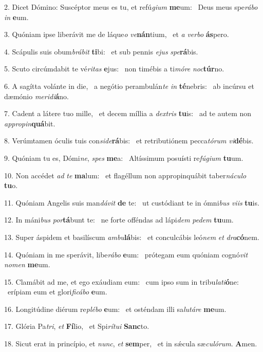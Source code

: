 2. Dicet Dómino: Suscéptor meus es tu, et refú\textit{gi}\textit{um} \textbf{me}um: \ast\  Deus meus spe\textit{rá}\textit{bo} \textit{in} \textbf{e}um.\

3. Quóniam ipse liberávit me de láque\textit{o} \textit{ve}\textbf{nán}tium, \ast\  et \textit{a} \textit{ver}\textit{bo} \textbf{ás}pero.\

4. Scápulis suis obum\textit{brá}\textit{bit} \textbf{ti}bi: \ast\  et sub pennis \textit{e}\textit{jus} \textit{spe}\textbf{rá}bis.\

5. Scuto circúmdabit te vé\textit{ri}\textit{tas} \textbf{e}jus: \ast\  non timébis a ti\textit{mó}\textit{re} \textit{noc}\textbf{túr}no.\

6. A sagítta volánte in die, \dag\  a negótio perambulán\textit{te} \textit{in} \textbf{té}nebris: \ast\  ab incúrsu et dæmónio \textit{me}\textit{ri}\textit{di}\textbf{á}no.\

7. Cadent a látere tuo mille, \dag\  et decem míllia a \textit{dex}\textit{tris} \textbf{tu}is: \ast\  ad te autem non \textit{ap}\textit{pro}\textit{pin}\textbf{quá}bit.\

8. Verúmtamen óculis tuis con\textit{si}\textit{de}\textbf{rá}bis: \ast\  et retributiónem pecca\textit{tó}\textit{rum} \textit{vi}\textbf{dé}bis.\

9. Quóniam tu es, Dómi\textit{ne}, \textit{spes} \textbf{me}a: \ast\  Altíssimum posuísti re\textit{fú}\textit{gi}\textit{um} \textbf{tu}um.\

10. Non accédet \textit{ad} \textit{te} \textbf{ma}lum: \ast\  et flagéllum non appropinquábit taber\textit{ná}\textit{cu}\textit{lo} \textbf{tu}o.\

11. Quóniam Angelis suis man\textit{dá}\textit{vit} \textbf{de} te: \ast\  ut custódiant te in ómni\textit{bus} \textit{vi}\textit{is} \textbf{tu}is.\

12. In máni\textit{bus} \textit{por}\textbf{tá}bunt te: \ast\  ne forte offéndas ad lápi\textit{dem} \textit{pe}\textit{dem} \textbf{tu}um.\

13. Super áspidem et basilíscum \textit{am}\textit{bu}\textbf{lá}bis: \ast\  et conculcábis leó\textit{nem} \textit{et} \textit{dra}\textbf{có}nem.\

14. Quóniam in me sperávit, libe\textit{rá}\textit{bo} \textbf{e}um: \ast\  prótegam eum quóniam cognó\textit{vit} \textit{no}\textit{men} \textbf{me}um.\

15. Clamábit ad me, et ego exáudiam eum: \dag\  cum ipso sum in tribu\textit{la}\textit{ti}\textbf{ó}ne: \ast\  erípiam eum et glori\textit{fi}\textit{cá}\textit{bo} \textbf{e}um.\

16. Longitúdine diérum re\textit{plé}\textit{bo} \textbf{e}um: \ast\  et osténdam illi sa\textit{lu}\textit{tá}\textit{re} \textbf{me}um.\

17. Glória Pa\textit{tri}, \textit{et} \textbf{Fí}lio, \ast\  et Spi\textit{rí}\textit{tu}\textit{i} \textbf{Sanc}to.\

18. Sicut erat in princípio, et \textit{nunc}, \textit{et} \textbf{sem}per, \ast\  et in sǽcula sæ\textit{cu}\textit{ló}\textit{rum}. \textbf{A}men.\

